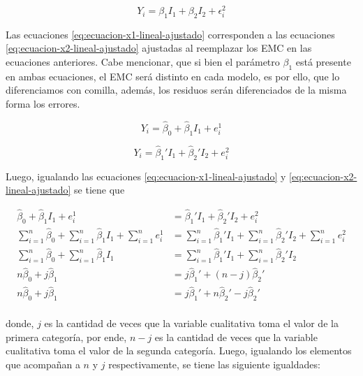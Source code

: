 \documentclass[
  11pt,
]{book}
\theoremstyle{definition}
\theoremstyle{definition}
\theoremstyle{definition}
\theoremstyle{definition}
\theoremstyle{remark}
\begin{document}
\begin{equation}
Y_i = \beta_1I_1 + \beta_2I_2 + \epsilon_i^2
\label{eq:ecuacion-x2-lineal}
\end{equation}

Las ecuaciones \eqref{eq:ecuacion-x1-lineal-ajustado} corresponden a las ecuaciones \eqref{eq:ecuacion-x2-lineal-ajustado} ajustadas al reemplazar los EMC en las ecuaciones anteriores. Cabe mencionar, que si bien el parámetro \(\beta_1\) está presente en ambas ecuaciones, el EMC será distinto en cada modelo, es por ello, que lo diferenciamos con comilla, además, los residuos serán diferenciados de la misma forma los errores.

\begin{equation}
Y_i = \widehat{\beta}_0 + \widehat{\beta}_1I_1 + e_i^1
\label{eq:ecuacion-x1-lineal-ajustado}
\end{equation}

\begin{equation}
Y_i = \widehat{\beta}_1'I_1 + \widehat{\beta}_2'I_2 + e_i^2
\label{eq:ecuacion-x2-lineal-ajustado}
\end{equation}

Luego, igualando las ecuaciones \eqref{eq:ecuacion-x1-lineal-ajustado} y \eqref{eq:ecuacion-x2-lineal-ajustado} se tiene que

\begin{equation}
\begin{split}
\widehat{\beta}_0 + \widehat{\beta}_1I_1 + e_i^1 &= \widehat{\beta}_1'I_1 + \widehat{\beta}_2'I_2 + e_i^2\\
\sum_{i=1}^n\widehat{\beta}_0 + \sum_{i=1}^n\widehat{\beta}_1I_1 + \sum_{i=1}^ne_i^1 &= \sum_{i=1}^n\widehat{\beta}_1'I_1 + \sum_{i=1}^n\widehat{\beta}_2'I_2 + \sum_{i=1}^ne_i^2\\
\sum_{i=1}^n\widehat{\beta}_0 + \sum_{i=1}^n\widehat{\beta}_1I_1 &= \sum_{i=1}^n\widehat{\beta}_1'I_1 + \sum_{i=1}^n\widehat{\beta}_2'I_2\\
n\widehat{\beta}_0 + j\widehat{\beta}_1 &= j\widehat{\beta}_1' + (n-j)\widehat{\beta}_2'\\
n\widehat{\beta}_0 + j\widehat{\beta}_1 &= j\widehat{\beta}_1' + n\widehat{\beta}_2'-j\widehat{\beta}_2'\\
\end{split}
\label{eq:igualando-x1-x2}
\end{equation}

donde, \(j\) es la cantidad de veces que la variable cualitativa toma el valor de la primera categoría, por ende, \(n-j\) es la cantidad de veces que la variable cualitativa toma el valor de la segunda categoría. Luego, igualando los elementos que acompañan a \(n\) y \(j\) respectivamente, se tiene las siguiente igualdades:
\end{document}
